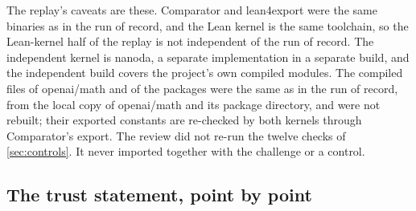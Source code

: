 \documentclass[11pt]{article}
\theoremstyle{definition}
\begin{document}
{The replay's caveats are these. Comparator and lean4export were the same binaries as in the run of record, and the Lean kernel is the same toolchain, so the Lean-kernel half of the replay is not independent of the run of record. The independent kernel is nanoda, a separate implementation in a separate build, and the independent build covers the project's own compiled modules. The compiled files of openai/math and of the packages were the same as in the run of record, from the local copy of openai/math and its package directory, and were not rebuilt; their exported constants are re-checked by both kernels through Comparator's export. The review did not re-run the twelve checks of \cref{sec:controls}. It never imported  together with the challenge or a control.

\subsection{The trust statement, point by point}\label{sec:trust}

}
\end{document}
